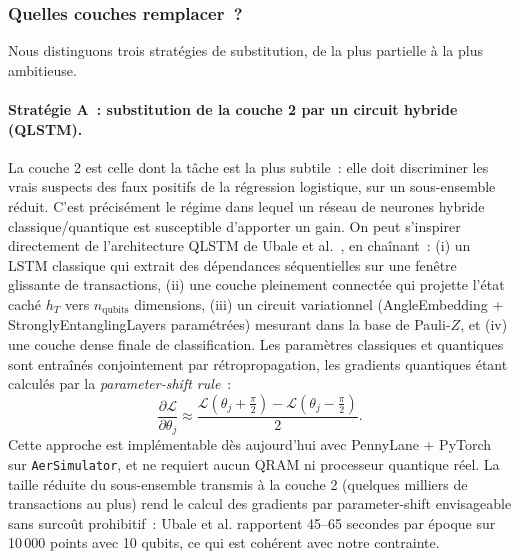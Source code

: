 \documentclass[a4paper]{article}
\begin{document}
\subsubsection{Quelles couches remplacer~?}
 
Nous distinguons trois stratégies de substitution, de la plus partielle à la plus ambitieuse.
 
\paragraph{Stratégie A~: substitution de la couche 2 par un circuit hybride (QLSTM).} La couche 2 est celle dont la tâche est la plus subtile~: elle doit discriminer les vrais suspects des faux positifs de la régression logistique, sur un sous-ensemble réduit. C'est précisément le régime dans lequel un réseau de neurones hybride classique/quantique est susceptible d'apporter un gain. On peut s'inspirer directement de l'architecture QLSTM de Ubale et al.~\cite{qlstm2025}, en chaînant~: (i) un LSTM classique qui extrait des dépendances séquentielles sur une fenêtre glissante de transactions, (ii) une couche pleinement connectée qui projette l'état caché $h_T$ vers $n_{\text{qubits}}$ dimensions, (iii) un circuit variationnel (AngleEmbedding + StronglyEntanglingLayers paramétrées) mesurant dans la base de Pauli-$Z$, et (iv) une couche dense finale de classification. Les paramètres classiques et quantiques sont entraînés conjointement par rétropropagation, les gradients quantiques étant calculés par la \emph{parameter-shift rule}~:
\[
\frac{\partial \mathcal{L}}{\partial \theta_j} \approx \frac{\mathcal{L}(\theta_j + \tfrac{\pi}{2}) - \mathcal{L}(\theta_j - \tfrac{\pi}{2})}{2}.
\]
Cette approche est implémentable dès aujourd'hui avec PennyLane + PyTorch sur \texttt{AerSimulator}, et ne requiert aucun QRAM ni processeur quantique réel. La taille réduite du sous-ensemble transmis à la couche 2 (quelques milliers de transactions au plus) rend le calcul des gradients par parameter-shift envisageable sans surcoût prohibitif~: Ubale et al. rapportent 45--65 secondes par époque sur 10\,000 points avec 10 qubits, ce qui est cohérent avec notre contrainte.
 
\end{document}
